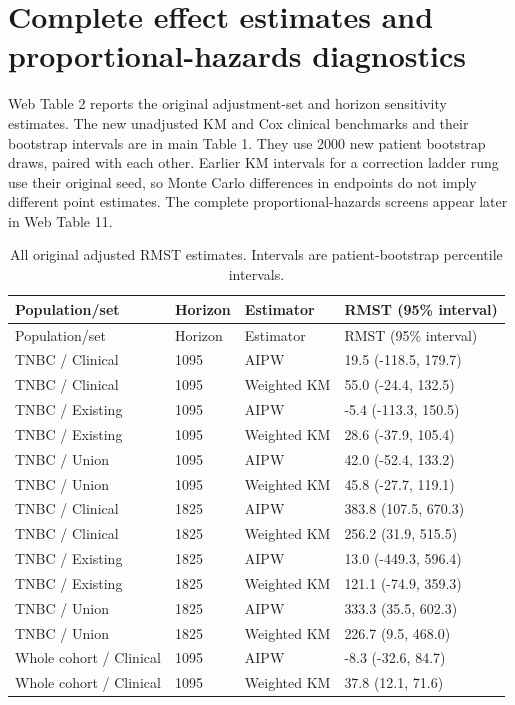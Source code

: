 \documentclass[12pt,letterpaper]{article}
\begin{document}
\section{Complete effect estimates and proportional-hazards diagnostics}
Web Table 2 reports the original adjustment-set and horizon sensitivity estimates.
The new unadjusted KM and Cox clinical benchmarks and their bootstrap intervals are in main Table 1.
They use 2000 new patient bootstrap draws, paired with each other. Earlier KM intervals for a correction
ladder rung use their original seed, so Monte Carlo differences in endpoints do not imply different point estimates.
The complete proportional-hazards screens appear later in Web Table 11.

\begin{longtable}{p{1.6in}p{0.65in}p{1.1in}p{2.45in}}
\caption{All original adjusted RMST estimates. Intervals are patient-bootstrap percentile intervals.}\\
\toprule
Population/set & Horizon & Estimator & RMST (95\% interval) \\
\midrule\endfirsthead
\toprule
Population/set & Horizon & Estimator & RMST (95\% interval) \\
\midrule\endhead
\bottomrule\endfoot
TNBC / Clinical & 1095 & AIPW & 19.5 (-118.5, 179.7) \\
TNBC / Clinical & 1095 & Weighted KM & 55.0 (-24.4, 132.5) \\
TNBC / Existing & 1095 & AIPW & -5.4 (-113.3, 150.5) \\
TNBC / Existing & 1095 & Weighted KM & 28.6 (-37.9, 105.4) \\
TNBC / Union & 1095 & AIPW & 42.0 (-52.4, 133.2) \\
TNBC / Union & 1095 & Weighted KM & 45.8 (-27.7, 119.1) \\
TNBC / Clinical & 1825 & AIPW & 383.8 (107.5, 670.3) \\
TNBC / Clinical & 1825 & Weighted KM & 256.2 (31.9, 515.5) \\
TNBC / Existing & 1825 & AIPW & 13.0 (-449.3, 596.4) \\
TNBC / Existing & 1825 & Weighted KM & 121.1 (-74.9, 359.3) \\
TNBC / Union & 1825 & AIPW & 333.3 (35.5, 602.3) \\
TNBC / Union & 1825 & Weighted KM & 226.7 (9.5, 468.0) \\
Whole cohort / Clinical & 1095 & AIPW & -8.3 (-32.6, 84.7) \\
Whole cohort / Clinical & 1095 & Weighted KM & 37.8 (12.1, 71.6) \\

\end{longtable}
\end{document}
